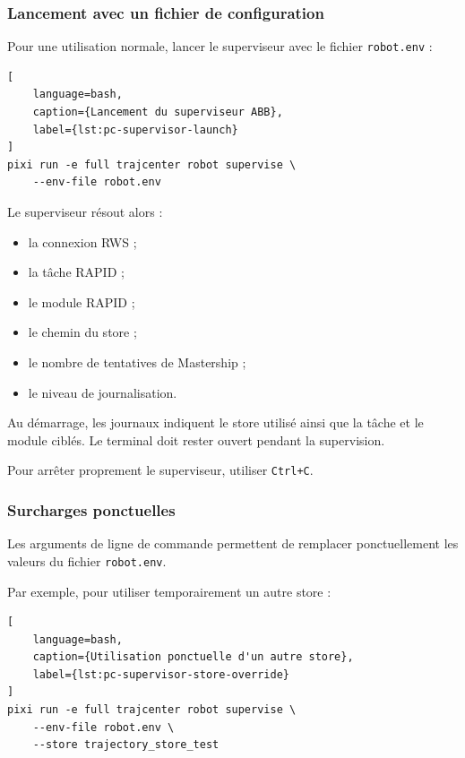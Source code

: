 \documentclass{rapportENSAM}
\begin{document}
\subsubsection{Lancement avec un fichier de configuration}
\label{subsubsec:pc-supervisor-launch}

Pour une utilisation normale, lancer le superviseur avec le fichier
\texttt{robot.env} :

\begin{lstlisting}[
    language=bash,
    caption={Lancement du superviseur ABB},
    label={lst:pc-supervisor-launch}
]
pixi run -e full trajcenter robot supervise \
    --env-file robot.env
\end{lstlisting}

Le superviseur résout alors :

\begin{itemize}
    \item la connexion RWS ;
    \item la tâche RAPID ;
    \item le module RAPID ;
    \item le chemin du store ;
    \item le nombre de tentatives de Mastership ;
    \item le niveau de journalisation.
\end{itemize}

Au démarrage, les journaux indiquent le store utilisé ainsi que la tâche et le
module ciblés. Le terminal doit rester ouvert pendant la supervision.

Pour arrêter proprement le superviseur, utiliser \texttt{Ctrl+C}.

\subsubsection{Surcharges ponctuelles}
\label{subsubsec:pc-supervisor-overrides}

Les arguments de ligne de commande permettent de remplacer ponctuellement les
valeurs du fichier \texttt{robot.env}.

Par exemple, pour utiliser temporairement un autre store :

\begin{lstlisting}[
    language=bash,
    caption={Utilisation ponctuelle d'un autre store},
    label={lst:pc-supervisor-store-override}
]
pixi run -e full trajcenter robot supervise \
    --env-file robot.env \
    --store trajectory_store_test
\end{lstlisting}
\end{document}
